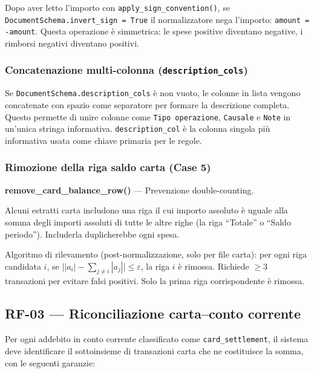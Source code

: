 \documentclass[11pt, a4paper]{article}
\begin{document}
Dopo aver letto l'importo con \texttt{apply\_sign\_convention()}, se
\texttt{DocumentSchema.invert\_sign = True} il normalizzatore nega l'importo:
\texttt{amount = -amount}. Questa operazione è simmetrica: le spese positive diventano
negative, i rimborsi negativi diventano positivi.

\subsubsection{Concatenazione multi-colonna (\texttt{description\_cols})}

Se \texttt{DocumentSchema.description\_cols} è non vuoto, le colonne in lista vengono
concatenate con spazio come separatore per formare la descrizione completa. Questo
permette di unire colonne come \texttt{Tipo operazione}, \texttt{Causale} e \texttt{Note}
in un'unica stringa informativa. \texttt{description\_col} è la colonna singola più
informativa usata come chiave primaria per le regole.

\subsubsection{Rimozione della riga saldo carta (Case 5)}

\begin{newbox}
\textbf{remove\_card\_balance\_row()} --- Prevenzione double-counting.

Alcuni estratti carta includono una riga il cui importo assoluto è uguale alla somma
degli importi assoluti di tutte le altre righe (la riga ``Totale'' o ``Saldo periodo'').
Includerla duplicherebbe ogni spesa.

Algoritmo di rilevamento (post-normalizzazione, solo per file carta):
per ogni riga candidata $i$, se $\bigl| |a_i| - \sum_{j \neq i} |a_j| \bigr| \leq \varepsilon$,
la riga $i$ è rimossa. Richiede $\geq 3$ transazioni per evitare falsi positivi.
Solo la prima riga corrispondente è rimossa.
\end{newbox}

\subsection{RF-03 --- Riconciliazione carta--conto corrente}

Per ogni addebito in conto corrente classificato come \texttt{card\_settlement}, il
sistema deve identificare il sottoinsieme di transazioni carta che ne costituisce la
somma, con le seguenti garanzie:
\end{document}
